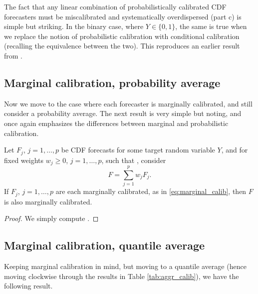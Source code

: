 \documentclass{article}
\begin{document}
The fact that any linear combination of probabilistically calibrated CDF
forecasters must be miscalibrated and systematically overdispersed (part c) is
simple but striking. In the binary case, where $Y \in \{0,1\}$, the same is true
when we replace the notion of probabilistic calibration with conditional
calibration (recalling the equivalence between the two). This reproduces an
earlier result from \citet{ranjan2010combining}.   

\subsection{Marginal calibration, probability average}

Now we move to the case where each forecaster is marginally calibrated, and still
consider a probability average. The next result is very simple but 
noting, and once again emphasizes the differences between marginal and
probabilistic calibration. 

\begin{theorem}
\label{thm:marginal_prob}
Let $F_j$, $j=1,\dots,p$ be CDF forecasts for some target random variable $Y$,
and for fixed weights $w_j \geq 0$, $j=1,\dots,p$, such that
, consider  
\[
F = \sum_{j=1}^p w_j F_j.
\]
If $F_j$, $j=1,\dots,p$ are each marginally calibrated, as in
\eqref{eq:marginal_calib}, then $F$ is also marginally calibrated.  
\end{theorem}

\begin{proof}
We simply compute .
\end{proof}

\subsection{Marginal calibration, quantile average}

Keeping marginal calibration in mind, but moving to a quantile average (hence
moving clockwise through the results in Table \ref{tab:aggr_calib}), we have the
following result. 
\end{document}

